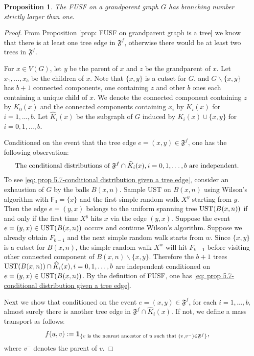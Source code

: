 \documentclass[12pt]{article}
\newtheorem{proposition}[theorem]{Proposition}
\numberwithin{equation}{section}
\newcommand{\be}{\begin{equation}}
\newcommand{\ee}{\end{equation}}
\newcommand{\1}{\mathbf{1}}
\begin{document}
\begin{proposition}\label{prop: branching number larger than one for FUSF on grandparent graph}
	The FUSF on a grandparent graph $G$ has branching number strictly larger than one.
\end{proposition}
\begin{proof}
	From Proposition \ref{prop: FUSF on grandparent graph is a tree} we know that there is at least one tree edge in $\mathfrak{F}^f$, otherwise there would be at least two trees in $\mathfrak{F}^f$.
	
	For $x\in V(G)$, let $y$ be the parent of $x$ and $z$ be the grandparent of $x$. Let $x_1,\ldots,x_b$ be the children of $x$. Note that $\{x,y\}$ is a cutset for $G$, and $G\backslash\{x,y\}$ has $b+1$ connected components, one containing $z$ and other $b$ ones each containing a unique child of $x$. We denote the connected component containing $z$ by $K_0(x)$ and the  connected components containing $x_i$ by  $K_i(x)$ for $i=1,\ldots,b$.
	Let 
	$\widehat{K}_i(x)$ be the subgraph of $G$ induced by $K_i(x)\cup\{x,y\}$ for $i=0,1,\ldots,b$. 
	 
	
	Conditioned on the event that the tree edge $e=(x,y)\in \mathfrak{F}^f$, one has the following observation: 
	\be\label{eq: prop 5.7-conditional distribution given a tree edge}
	\textnormal{The conditional distributions of } \mathfrak{F}^f\cap \widehat{K}_i(x),i=0,1,\ldots,b \textnormal{ are independent.}
	\ee
	To see \eqref{eq: prop 5.7-conditional distribution given a tree edge}, consider an exhaustion of $G$ by the balls $B(x,n)$. Sample UST on $B(x,n)$ using Wilson's algorithm  with $\mathsf{F}_0=\{x\}$ and the first simple random walk $X^y$ starting from $y$. Then the edge $e=(y,x)$ belongs to the uniform spanning tree $\textnormal{UST}(B(x,n))$ if and only if  the first time $X^y$ hits $x$ via the edge $(y,x)$. Suppose the event  $e=(y,x)\in \textnormal{UST}(B(x,n))$ occurs and continue Wilson's algorithm. Suppose we already obtain $F_{k-1}$ and the next simple random walk starts from $w$. Since $\{x,y\}$ is a cutset for $B(x,n)$, the simple random walk $X^w$ will hit $F_{k-1}$ before visiting other connected component of $B(x,n)\backslash\{x,y\}$. Therefore the $b+1$ trees $\textnormal{UST}(B(x,n))\cap \widehat{K}_i(x),i=0,1,\ldots,b$ are independent conditioned on $e=(y,x)\in \textnormal{UST}(B(x,n))$. By the definition of FUSF, one has \eqref{eq: prop 5.7-conditional distribution given a tree edge}.
	
	
	Next we show that conditioned on the event $e=(x,y)\in\mathfrak{F}^f$, for each $i=1,\ldots,b$, almost surely there is another tree edge in $\mathfrak{F}^f\cap \widehat{K}_i(x)$.
	 If not, we define a mass transport as follows: \[f(u,v):=\mathbf{1}_{ \{ v \textnormal{ is the nearest ancestor of } u \textnormal{ such that } (v,v^-)\in\mathfrak{F}^f \} },\]
		where $v^-$ denotes the parent of $v$.
		

\end{proof}
\end{document}
